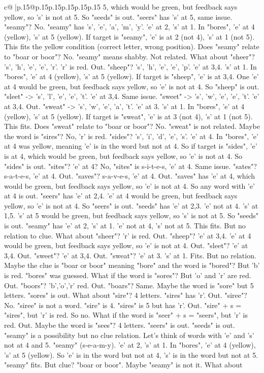 \documentclass{article}
\begin{document}
{\begin{supertabular}{c@{$\;$}|p{.15\linewidth}@{}p{.15\linewidth}p{.15\linewidth}p{.15\linewidth}p{.15\linewidth}p{.15\linewidth}}
{{{5, which would be green, but feedback says yellow, so 's' is not at 5. So "seeds" is out. "seers" has 's' at 5, same issue. "seamy"? No. "seamy" has 's', 'e', 'a', 'm', 'y'. 'e' at 2, 's' at 1. In "bores", 'e' at 4 (yellow), 's' at 5 (yellow). If target is "seamy", 'e' is at 2 (not 4), 's' at 1 (not 5). This fits the yellow condition (correct letter, wrong position). Does "seamy" relate to "boar or boor"? No. "seamy" means shabby. Not related. What about "sheer"? 's', 'h', 'e', 'e', 'r'. 'r' is red. Out. "sheep"? 's', 'h', 'e', 'e', 'p'. 'e' at 3,4. 's' at 1. In "bores", 'e' at 4 (yellow), 's' at 5 (yellow). If target is "sheep", 'e' is at 3,4. One 'e' at 4 would be green, but feedback says yellow, so 'e' is not at 4. So "sheep" is out. "sleet" {-}> 's', 'l', 'e', 'e', 't'. 'e' at 3,4. Same issue. "sweet" {-}> 's', 'w', 'e', 'e', 't'. 'e' at 3,4. Out. "sweat" {-}> 's', 'w', 'e', 'a', 't'. 'e' at 3. 's' at 1. In "bores", 'e' at 4 (yellow), 's' at 5 (yellow). If target is "sweat", 'e' is at 3 (not 4), 's' at 1 (not 5). This fits. Does "sweat" relate to "boar or boor"? No. "sweat" is not related. Maybe the word is "sires"? No, 'r' is red. "sides"? 's', 'i', 'd', 'e', 's'. 'e' at 4. In "bores", 'e' at 4 was yellow, meaning 'e' is in the word but not at 4. So if target is "sides", 'e' is at 4, which would be green, but feedback says yellow, so 'e' is not at 4. So "sides" is out. "sites"? 'e' at 4? No, "sites" is s{-}i{-}t{-}e{-}s, 'e' at 4. Same issue. "sates"? s{-}a{-}t{-}e{-}s, 'e' at 4. Out. "saves"? s{-}a{-}v{-}e{-}s, 'e' at 4. Out. "saves" has 'e' at 4, which would be green, but feedback says yellow, so 'e' is not at 4. So any word with 'e' at 4 is out. "seers" has 'e' at 2,4. 'e' at 4 would be green, but feedback says yellow, so 'e' is not at 4. So "seers" is out. "seeds" has 'e' at 2,3. 'e' not at 4. 's' at 1,5. 's' at 5 would be green, but feedback says yellow, so 's' is not at 5. So "seeds" is out. "seamy" has 'e' at 2, 's' at 1. 'e' not at 4, 's' not at 5. This fits. But no relation to clue. What about "sheer"? 'r' is red. Out. "sheep"? 'e' at 3,4. 'e' at 4 would be green, but feedback says yellow, so 'e' is not at 4. Out. "sleet"? 'e' at 3,4. Out. "sweet"? 'e' at 3,4. Out. "sweat"? 'e' at 3. 's' at 1. Fits. But no relation. Maybe the clue is "boar or boor" meaning "bore" and the word is "bored"? But 'b' is red. "bores" was guessed. What if the word is "sores"? But 'o' and 'r' are red. Out. "boors"? 'b','o','r' red. Out. "boars"? Same. Maybe the word is "sore" but 5 letters. "sores" is out. What about "sire"? 4 letters. "sires" has 'r'. Out. "siree"? No. "siree" is not a word. "sire" is 4. "sires" is 5 but has 'r'. Out. "sire" + s = "sires", but 'r' is red. So no. What if the word is "seer" + s = "seers", but 'r' is red. Out. Maybe the word is "sees"? 4 letters. "seers" is out. "seeds" is out. "seamy" is a possibility but no clue relation. Let's think of words with 'e' and 's' not at 4 and 5. "seamy" (s{-}e{-}a{-}m{-}y). 'e' at 2, 's' at 1. In "bores", 'e' at 4 (yellow), 's' at 5 (yellow). So 'e' is in the word but not at 4, 's' is in the word but not at 5. "seamy" fits. But clue? "boar or boor". Maybe "seamy" is not it. What about }}}
\end{supertabular}}
\end{document}
